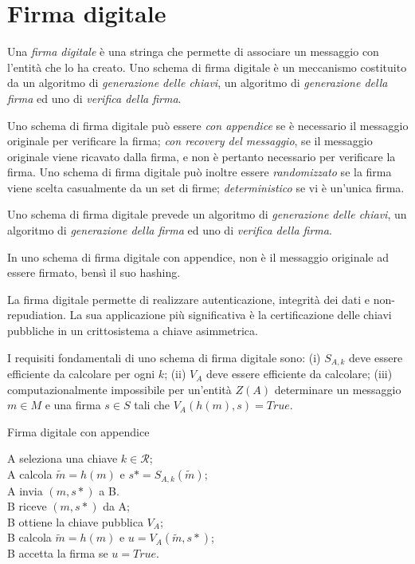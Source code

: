 \chapter{Firma digitale}
\label{chp:digital-signature}

Una \textit{firma digitale} è una stringa che permette di associare un messaggio con l'entità che lo ha creato.
Uno schema di firma digitale è un meccanismo costituito da un algoritmo di \textit{generazione delle chiavi}, un algoritmo di \textit{generazione della firma} ed uno di \textit{verifica della firma}.

Uno schema di firma digitale può essere
\textit{con appendice} se è necessario il messaggio originale per verificare la firma;
\textit{con recovery del messaggio}, se il messaggio originale viene ricavato dalla firma, e non è pertanto necessario per verificare la firma.
Uno schema di firma digitale può inoltre essere
\textit{randomizzato} se la firma viene scelta casualmente da un set di firme;
\textit{deterministico} se vi è un'unica firma.

Uno schema di firma digitale prevede un algoritmo di \textit{generazione delle chiavi}, un algoritmo di \textit{generazione della firma} ed uno di \textit{verifica della firma}.

In uno schema di firma digitale con appendice, non è il messaggio originale ad essere firmato, bensì il suo hashing.

La firma digitale permette di realizzare autenticazione, integrità dei dati e non-repudiation. La sua applicazione più significativa è la certificazione delle chiavi pubbliche in un crittosistema a chiave asimmetrica.

I requisiti fondamentali di uno schema di firma digitale sono:
(i) $S_{A,k}$ deve essere efficiente da calcolare per ogni $k$;
(ii) $V_{A}$ deve essere efficiente da calcolare;
(iii) computazionalmente impossibile per un'entità $Z(A)$ determinare un messaggio $m \in M$ e una firma $s \in S$ tali che $V_{A}(h(m),s)=True$.

\bigskip
\begin{algorithm}[H]
  \caption{Firma digitale con appendice}
  \label{alg:digital-signature-appendix}
  \SetAlgoNoLine
  A seleziona una chiave $k \in \mathcal{R}$;\\
  A calcola $\tilde{m}=h(m)$ e $s*=S_{A,k}(\tilde{m})$;\\
  A invia $(m,s*)$ a B.\\

  B riceve $(m,s*)$ da A;\\
  B ottiene la chiave pubblica $V_{A}$;\\
  B calcola $\tilde{m}=h(m)$ e $u=V_{A}(\tilde{m},s*)$;\\
  B accetta la firma se $u=True$.
\end{algorithm}

